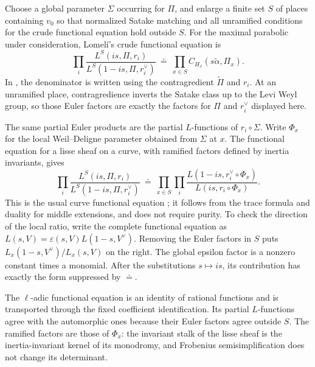 Choose a global parameter $\Sigma$ occurring for $\Pi$, and enlarge
a finite set $S$ of places containing $v_0$ so that normalized
Satake matching and all unramified conditions for the crude
functional equation hold outside $S$.  For the maximal parabolic
under consideration, Lomel\'i's crude functional equation is
\begin{equation}
 \prod_i
 \frac{L^S(is,\Pi,r_i)}
      {L^S(1-is,\Pi,r_i^\vee)}
     \ \doteq\ \prod_{x\in S}
                 C_{H_x}(s\widetilde\alpha,\Pi_x).
 \label{eq:crude-functional-equation}
\end{equation}
In \cite[Theorem~4.3]{LomeliLS}, the denominator is written using
the contragredient $\widetilde\Pi$ and $r_i$.  At an unramified
place, contragredience inverts the Satake class up to the Levi Weyl
group, so those Euler factors are exactly the factors for $\Pi$
and $r_i^\vee$ displayed here.

The same partial Euler products are the partial $L$-functions of
$r_i\circ\Sigma$.  Write $\Phi_x$ for the local Weil--Deligne
parameter obtained from $\Sigma$ at $x$.  The functional equation
for a lisse sheaf on a curve, with ramified factors defined by
inertia invariants, gives
\begin{equation}
 \prod_i
 \frac{L^S(is,\Pi,r_i)}
      {L^S(1-is,\Pi,r_i^\vee)}
 \ \doteq\
 \prod_{x\in S}\prod_i
   \frac{L(1-is,r_i^\vee\circ\Phi_x)}
        {L(is,r_i\circ\Phi_x)}.
 \label{eq:galois-functional-equation}
\end{equation}
This is the usual curve functional equation
\cite[\S\S9--10]{DeligneConstants}; it follows from the trace formula
and duality for middle extensions, and does not require purity.
To check the direction of the local ratio, write the complete
functional equation as $L(s,V)=\varepsilon(s,V)L(1-s,V^\vee)$.
Removing the Euler factors in $S$ puts
$L_x(1-s,V^\vee)/L_x(s,V)$ on the right.  The global epsilon factor
is a nonzero constant times a monomial.  After the substitutions
$s\mapsto is$, its contribution has exactly the form suppressed
by $\doteq$.

The $\ell$-adic functional equation is an identity of rational
functions and is transported through the fixed coefficient
identification.  Its partial $L$-functions agree with the
automorphic ones because their Euler factors agree outside $S$.
The ramified factors are those of $\Phi_x$: the invariant stalk of
the lisse sheaf is the inertia-invariant kernel of its monodromy,
and Frobenius semisimplification does not change its determinant.

